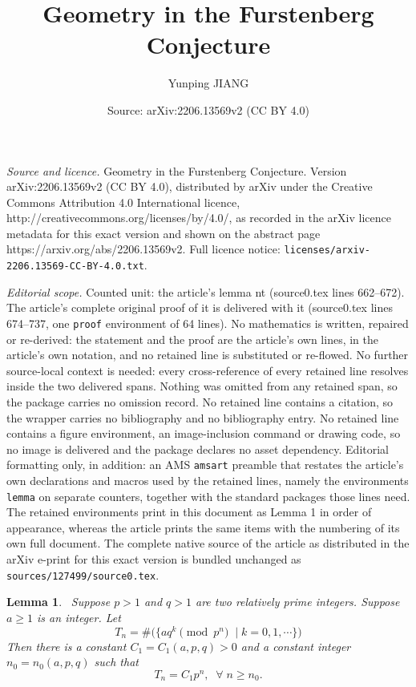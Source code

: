 \documentclass[10pt,a4paper]{amsart}
\title{Geometry in the Furstenberg Conjecture}
\author{Yunping JIANG}
\date{Source: arXiv:2206.13569v2 (CC BY 4.0)}
\newtheorem{lemma}{Lemma}
\begin{document}
\maketitle

\noindent\emph{Source and licence.} Geometry in the Furstenberg Conjecture. Version arXiv:2206.13569v2 (CC BY 4.0), distributed by arXiv under the Creative Commons Attribution 4.0 International licence, http://creativecommons.org/licenses/by/4.0/, as recorded in the arXiv licence metadata for this exact version and shown on the abstract page https://arxiv.org/abs/2206.13569v2. Full licence notice: \texttt{licenses/arxiv-2206.13569-CC-BY-4.0.txt}.\par\smallskip

\noindent\textit{Editorial scope.} Counted unit: the article's lemma nt (source0.tex lines 662--672). The article's complete original proof of it is delivered with it (source0.tex lines 674--737, one \texttt{proof} environment of 64 lines). No mathematics is written, repaired or re-derived: the statement and the proof are the article's own lines, in the article's own notation, and no retained line is substituted or re-flowed.  No further source-local context is needed: every cross-reference of every retained line resolves inside the two delivered spans.  Nothing was omitted from any retained span, so the package carries no omission record.  No retained line contains a citation, so the wrapper carries no bibliography and no bibliography entry.  No retained line contains a figure environment, an image-inclusion command or drawing code, so no image is delivered and the package declares no asset dependency.  Editorial formatting only, in addition: an AMS \texttt{amsart} preamble that restates the article's own declarations and macros used by the retained lines, namely the environments \texttt{lemma} on separate counters, together with the standard packages those lines need.  The retained environments print in this document as Lemma 1 in order of appearance, whereas the article prints the same items with the numbering of its own full document.  The complete native source of the article as distributed in the arXiv e-print for this exact version is bundled unchanged as \texttt{sources/127499/source0.tex}.
\begin{lemma}~\label{nt} 
Suppose $p>1$ and $q>1$ are two relatively prime integers. Suppose $a\geq 1$ is an integer. 
Let 
$$
T_{n}=\#\Big(\{ aq^k \pmod{p^n}\;\;|\; k=0, 1, \cdots\}\Big)
$$
Then there is a constant $C_{1}=C_{1}(a,p,q)>0$ and a constant integer $n_{0}=n_{0}(a, p, q)$ such that 
$$
T_n=C_{1}p^n, \;\;\forall \; n\geq n_0.
$$
\end{lemma}
\end{document}
